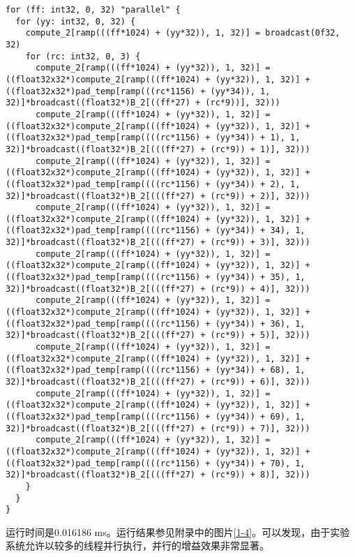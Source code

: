 \begin{lstlisting}[caption=并行执行后的循环表达式]
for (ff: int32, 0, 32) "parallel" {
  for (yy: int32, 0, 32) {
    compute_2[ramp(((ff*1024) + (yy*32)), 1, 32)] = broadcast(0f32, 32)
    for (rc: int32, 0, 3) {
      compute_2[ramp(((ff*1024) + (yy*32)), 1, 32)] = ((float32x32*)compute_2[ramp(((ff*1024) + (yy*32)), 1, 32)] + ((float32x32*)pad_temp[ramp(((rc*1156) + (yy*34)), 1, 32)]*broadcast((float32*)B_2[((ff*27) + (rc*9))], 32)))
      compute_2[ramp(((ff*1024) + (yy*32)), 1, 32)] = ((float32x32*)compute_2[ramp(((ff*1024) + (yy*32)), 1, 32)] + ((float32x32*)pad_temp[ramp((((rc*1156) + (yy*34)) + 1), 1, 32)]*broadcast((float32*)B_2[(((ff*27) + (rc*9)) + 1)], 32)))
      compute_2[ramp(((ff*1024) + (yy*32)), 1, 32)] = ((float32x32*)compute_2[ramp(((ff*1024) + (yy*32)), 1, 32)] + ((float32x32*)pad_temp[ramp((((rc*1156) + (yy*34)) + 2), 1, 32)]*broadcast((float32*)B_2[(((ff*27) + (rc*9)) + 2)], 32)))
      compute_2[ramp(((ff*1024) + (yy*32)), 1, 32)] = ((float32x32*)compute_2[ramp(((ff*1024) + (yy*32)), 1, 32)] + ((float32x32*)pad_temp[ramp((((rc*1156) + (yy*34)) + 34), 1, 32)]*broadcast((float32*)B_2[(((ff*27) + (rc*9)) + 3)], 32)))
      compute_2[ramp(((ff*1024) + (yy*32)), 1, 32)] = ((float32x32*)compute_2[ramp(((ff*1024) + (yy*32)), 1, 32)] + ((float32x32*)pad_temp[ramp((((rc*1156) + (yy*34)) + 35), 1, 32)]*broadcast((float32*)B_2[(((ff*27) + (rc*9)) + 4)], 32)))
      compute_2[ramp(((ff*1024) + (yy*32)), 1, 32)] = ((float32x32*)compute_2[ramp(((ff*1024) + (yy*32)), 1, 32)] + ((float32x32*)pad_temp[ramp((((rc*1156) + (yy*34)) + 36), 1, 32)]*broadcast((float32*)B_2[(((ff*27) + (rc*9)) + 5)], 32)))
      compute_2[ramp(((ff*1024) + (yy*32)), 1, 32)] = ((float32x32*)compute_2[ramp(((ff*1024) + (yy*32)), 1, 32)] + ((float32x32*)pad_temp[ramp((((rc*1156) + (yy*34)) + 68), 1, 32)]*broadcast((float32*)B_2[(((ff*27) + (rc*9)) + 6)], 32)))
      compute_2[ramp(((ff*1024) + (yy*32)), 1, 32)] = ((float32x32*)compute_2[ramp(((ff*1024) + (yy*32)), 1, 32)] + ((float32x32*)pad_temp[ramp((((rc*1156) + (yy*34)) + 69), 1, 32)]*broadcast((float32*)B_2[(((ff*27) + (rc*9)) + 7)], 32)))
      compute_2[ramp(((ff*1024) + (yy*32)), 1, 32)] = ((float32x32*)compute_2[ramp(((ff*1024) + (yy*32)), 1, 32)] + ((float32x32*)pad_temp[ramp((((rc*1156) + (yy*34)) + 70), 1, 32)]*broadcast((float32*)B_2[(((ff*27) + (rc*9)) + 8)], 32)))
    }
  }
}
\end{lstlisting}

运行时间是0.016186 ms。运行结果参见附录中的图片\textcolor{MidnightBlue}{\ref{1-4}}。可以发现，由于实验系统允许以较多的线程并行执行，并行的增益效果非常显著。

